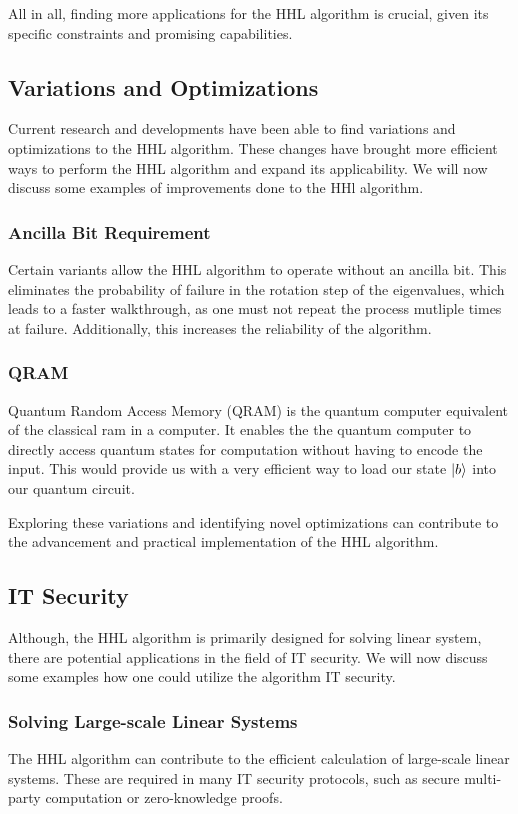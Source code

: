 All in all, finding more applications for the HHL algorithm is crucial, given its specific constraints and promising capabilities.


\subsection{Variations and Optimizations}
Current research and developments have been able to find variations and optimizations to the HHL algorithm.
These changes have brought more efficient ways to perform the HHL algorithm and expand its applicability.
We will now discuss some examples of improvements done to the HHl algorithm.

    \subsubsection{Ancilla Bit Requirement} 
    Certain variants allow the HHL algorithm to operate without an ancilla bit.
    This eliminates the probability of failure in the rotation step of the eigenvalues, which leads to a faster walkthrough, as one must not repeat the process mutliple times at failure.
    Additionally, this increases the reliability of the algorithm.

    \subsubsection{QRAM}
    Quantum Random Access Memory (QRAM) is the quantum computer equivalent of the classical ram in a computer.
    It enables the the quantum computer to directly access quantum states for computation without having to encode the input. 
    This would provide us with a very efficient way to load our state $\ket b$ into our quantum circuit.

Exploring these variations and identifying novel optimizations can contribute to the advancement and practical implementation of the HHL algorithm.


\subsection{IT Security}
Although, the HHL algorithm is primarily designed for solving linear system, there are potential applications in the field of IT security.
We will now discuss some examples how one could utilize the algorithm IT security.

    \subsubsection{Solving Large-scale Linear Systems}
    The HHL algorithm can contribute to the efficient calculation of large-scale linear systems.
    These are required in many IT security protocols, such as secure multi-party computation or zero-knowledge proofs. 

